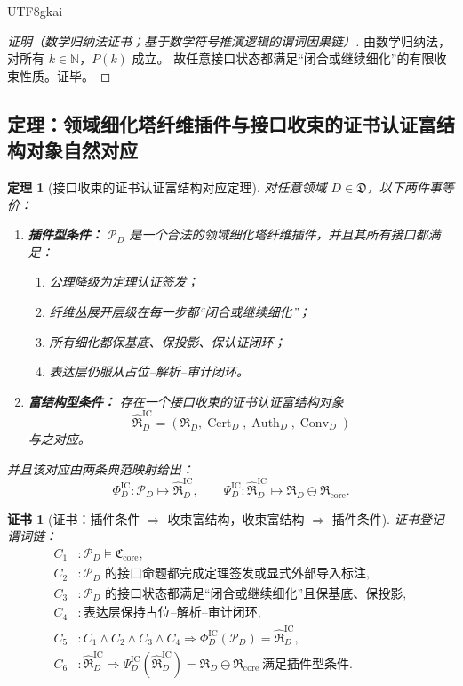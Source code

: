 \documentclass[12pt]{article}
\newtheorem{theorem}{定理}[section]
\newtheorem{Certificate}{证书}[section]
\newcommand{\NN}{\mathbb{N}}
\newcommand{\Cert}{\operatorname{Cert}}
\newcommand{\Auth}{\operatorname{Auth}}
\newcommand{\Conv}{\operatorname{Conv}}
\begin{document}
\begin{CJK*}{UTF8}{gkai}
\begin{proof}[证明（数学归纳法证书；基于数学符号推演逻辑的谓词因果链）]
由数学归纳法，对所有 $k\in\NN$，$P(k)$ 成立。
故任意接口状态都满足“闭合或继续细化”的有限收束性质。证毕。
\end{proof}

\subsection{定理：领域细化塔纤维插件与接口收束的证书认证富结构对象自然对应}
\label{subsec:tex37-ch9-theorem}

\begin{theorem}[接口收束的证书认证富结构对应定理]
\label{thm:tex37-ch9-correspondence}
对任意领域 $D\in\mathfrak D$，以下两件事等价：
\begin{enumerate}
  \item \textbf{插件型条件：}
  $\mathcal P_D$ 是一个合法的领域细化塔纤维插件，并且其所有接口都满足：
  \begin{enumerate}
    \item 公理降级为定理认证签发；
    \item 纤维丛展开层级在每一步都“闭合或继续细化”；
    \item 所有细化都保基底、保投影、保认证闭环；
    \item 表达层仍服从占位--解析--审计闭环。
  \end{enumerate}
  \item \textbf{富结构型条件：}
  存在一个接口收束的证书认证富结构对象
  \[
    \widehat{\mathfrak R}_D^{\mathrm{IC}}
    =
    (\mathfrak R_D,\Cert_D,\Auth_D,\Conv_D)
  \]
  与之对应。
\end{enumerate}
并且该对应由两条典范映射给出：
\[
  \Phi_D^{\mathrm{IC}}:
  \mathcal P_D
  \longmapsto
  \widehat{\mathfrak R}_D^{\mathrm{IC}},
  \qquad
  \Psi_D^{\mathrm{IC}}:
  \widehat{\mathfrak R}_D^{\mathrm{IC}}
  \longmapsto
  \mathfrak R_D\ominus \mathfrak R_{\mathrm{core}}.
\]
\end{theorem}

\begin{Certificate}[证书：插件条件 $\Rightarrow$ 收束富结构，收束富结构 $\Rightarrow$ 插件条件]
\label{cert:tex37-ch9-correspondence}
证书登记谓词链：
\[
\begin{aligned}
  C_1 &: \mathcal P_D\models \mathfrak C_{\mathrm{core}},\\
  C_2 &: \text{$\mathcal P_D$ 的接口命题都完成定理签发或显式外部导入标注},\\
  C_3 &: \text{$\mathcal P_D$ 的接口状态都满足“闭合或继续细化”且保基底、保投影},\\
  C_4 &: \text{表达层保持占位--解析--审计闭环},\\
  C_5 &: C_1\wedge C_2\wedge C_3\wedge C_4
  \Rightarrow
  \Phi_D^{\mathrm{IC}}(\mathcal P_D)=\widehat{\mathfrak R}_D^{\mathrm{IC}},\\
  C_6 &: \widehat{\mathfrak R}_D^{\mathrm{IC}}
  \Rightarrow
  \Psi_D^{\mathrm{IC}}(\widehat{\mathfrak R}_D^{\mathrm{IC}})
  =
  \mathfrak R_D\ominus \mathfrak R_{\mathrm{core}}
  \ \text{满足插件型条件}.
\end{aligned}
\]
\end{Certificate}


\end{CJK*}
\end{document}
